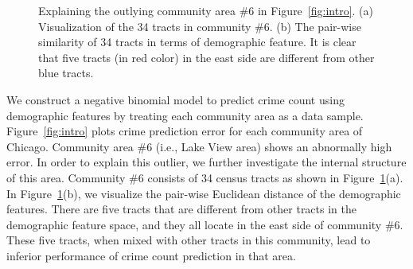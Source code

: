 \begin{figure}
\centering
{}
\caption{Explaining the outlying community area \#6 in Figure~\ref{fig:intro}. (a) Visualization of the 34 tracts in community \#6. (b) The pair-wise similarity of 34 tracts in terms of demographic feature. It is clear that five tracts (in red color) in the east side are different from other blue tracts.}
\label{fig:intro-explain}
\end{figure}

\begin{example}
We construct a negative binomial model to predict crime count using demographic features by treating each community area as a data sample. Figure~\ref{fig:intro} plots crime prediction error for each community area of Chicago. Community area \#6 (i.e., Lake View area) shows an abnormally high error. In order to explain this outlier, we further investigate the internal structure of this area. Community \#6 consists of 34 census tracts as shown in Figure~\ref{fig:intro-explain}(a).  In Figure~\ref{fig:intro-explain}(b), we visualize the pair-wise Euclidean distance of the demographic features. There are five tracts that are different from other tracts in the demographic feature space, and they all locate in the east side of community \#6. These five tracts, when mixed with other tracts in this community, lead to inferior performance of crime count prediction in that area. 
\end{example}

